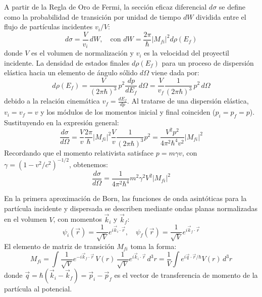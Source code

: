 A partir de la Regla de Oro de Fermi, la sección eficaz diferencial $d\sigma$ se define como la probabilidad de transición por unidad de tiempo $dW$ dividida entre el flujo de partículas incidentes $v_i / V$:
\begin{equation}
    d\sigma = \frac{V}{v_i} \, dW, \quad \text{con } dW = \frac{2\pi}{\hbar} |M_{fi}|^2 d\rho(E_f)
\end{equation}
donde $V$ es el volumen de normalización y $v_i$ es la velocidad del proyectil incidente. La densidad de estados finales $d\rho(E_f)$ para un proceso de dispersión elástica hacia un elemento de ángulo sólido $d\Omega$ viene dada por:
\begin{equation}
    d\rho(E_f) = \frac{V}{(2\pi\hbar)^3} \, p^2 \frac{dp}{dE_f} \, d\Omega = \frac{V}{v_f} \frac{1}{(2\pi\hbar)^3} \, p^2 \, d\Omega
\end{equation}
debido a la relación cinemática $v_f = \frac{dE_f}{dp}$. Al tratarse de una dispersión elástica, $v_i = v_f = v$ y los módulos de los momentos inicial y final coinciden ($p_i = p_f = p$). Sustituyendo en la expresión general:
\begin{equation}
    \frac{d\sigma}{d\Omega} = \frac{V}{v} \frac{2\pi}{\hbar} |M_{fi}|^2 \frac{V}{v} \frac{1}{(2\pi\hbar)^3} p^2 = \frac{V^2 p^2}{4\pi^2 \hbar^4 v^2} |M_{fi}|^2
\end{equation}
Recordando que el momento relativista satisface $p = m \gamma v$, con $\gamma = (1 - v^2/c^2)^{-1/2}$, obtenemos:
\begin{equation}
    \frac{d\sigma}{d\Omega} = \frac{1}{4\pi^2 \hbar^4} m^2 \gamma^2 V^2 |M_{fi}|^2
\end{equation}

En la primera aproximación de Born, las funciones de onda asintóticas para la partícula incidente y dispersada se describen mediante ondas planas normalizadas en el volumen $V$, con momentos $\vec{k}_i$ y $\vec{k}_f$:
\begin{equation}
    \psi_i(\vec{r}) = \frac{1}{\sqrt{V}} e^{i \vec{k}_i \cdot \vec{r}}, \quad \psi_f(\vec{r}) = \frac{1}{\sqrt{V}} e^{i \vec{k}_f \cdot \vec{r}}
\end{equation}
El elemento de matriz de transición $M_{fi}$ toma la forma:
\begin{equation}
    M_{fi} = \int \frac{1}{\sqrt{V}} e^{-i \vec{k}_f \cdot \vec{r}} \, V(r) \, \frac{1}{\sqrt{V}} e^{i \vec{k}_i \cdot \vec{r}} \, d^3r = \frac{1}{V} \int e^{i \vec{q} \cdot \vec{r} / \hbar} V(r) \, d^3r
\end{equation}
donde $\vec{q} = \hbar(\vec{k}_i - \vec{k}_f) = \vec{p}_i - \vec{p}_f$ es el vector de transferencia de momento de la partícula al potencial.

